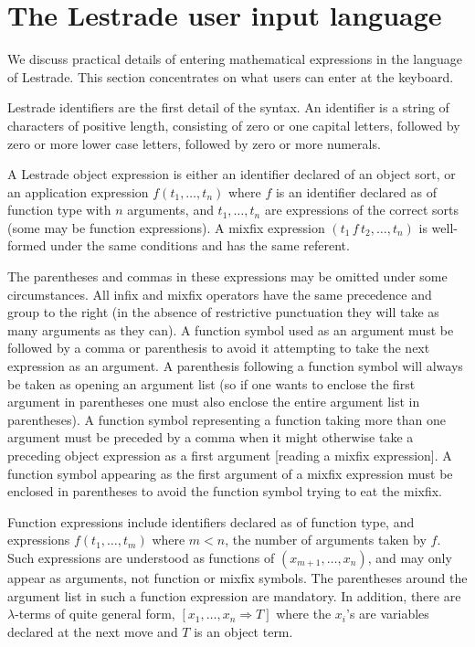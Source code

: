 \documentclass[12pt]{article}
\begin{document}
\section{The Lestrade user input language}


We discuss practical details of entering mathematical expressions in the language of Lestrade.  This section concentrates on what users can enter at the keyboard. 

Lestrade identifiers are the first detail of the syntax.  An identifier is a string of characters of positive length, consisting of zero or one capital letters,
followed by zero or more lower case letters, followed by zero or more numerals.

A Lestrade object expression is either an identifier declared of an object sort, or an application expression $f(t_1,\ldots,t_n)$  where $f$ is
an identifier declared as of function type with $n$ arguments, and $t_1,\ldots,t_n$ are expressions of the correct sorts (some may be function expressions).
A mixfix expression $(t_1 \,f \,t_2, \ldots, t_n)$ is well-formed under the same conditions and has the same referent.  

The parentheses and commas in these expressions may be omitted under some circumstances.  All infix and mixfix operators have the same precedence and group to the right (in the absence of restrictive punctuation they will take as many arguments as they can).  A function symbol used as an argument must be followed by a comma or parenthesis to avoid it attempting to take the next expression as an argument.  A parenthesis following a function symbol will always be taken as opening an argument list (so if one wants to enclose the first argument in parentheses one must also enclose the entire argument list in parentheses).  A function symbol representing a function taking more than one argument
must be preceded by a comma when it might otherwise take a preceding object expression as a first argument [reading a mixfix expression].  A function symbol appearing as the first argument of a mixfix expression must be enclosed in parentheses to avoid the function symbol trying to eat the mixfix.

Function expressions include identifiers declared as of function type, and expressions $f(t_1,\ldots,t_m)$ where $m<n$, the number of arguments taken by $f$.  Such expressions are understood as functions of $(x_{m+1},\ldots,x_n)$, and may only appear as arguments, not function or mixfix symbols.  The parentheses around the argument list in such a function expression are mandatory.  In addition, there are $\lambda$-terms of quite general form, $[x_1,\ldots,x_n \Rightarrow T]$ where the $x_i$'s are variables declared at the next move and $T$ is an object term.
\end{document}
